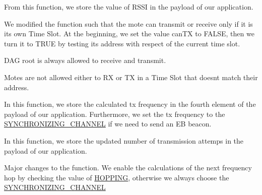 
\begin{DoxyRefList}
\item[\label{_l_k_n_code_edits__LKN_code_edits000013}%
\hypertarget{_l_k_n_code_edits__LKN_code_edits000013}{}%
Member \hyperlink{_i_e_e_e802154_e_8c_a58945f36d3b05dea65c4d7014283154a}{activity\+\_\+ri5} (P\+O\+R\+T\+\_\+\+R\+A\+D\+I\+O\+T\+I\+M\+E\+R\+\_\+\+W\+I\+D\+TH captured\+Time)]From this function, we store the value of R\+S\+SI in the payload of our application.  
\item[\label{_l_k_n_code_edits__LKN_code_edits000010}%
\hypertarget{_l_k_n_code_edits__LKN_code_edits000010}{}%
Member \hyperlink{_i_e_e_e802154_e_8c_a365846cd666a324ee0d6ff55f79bb976}{activity\+\_\+ti1\+O\+Rri1} ()]We modified the function such that the mote can transmit or receive only if it is its own Time Slot. At the beginning, we set the value can\+TX to F\+A\+L\+SE, then we turn it to T\+R\+UE by testing its address with respect of the current time slot.
\begin{DoxyItemize}
\item D\+AG root is always allowed to receive and transmit.
\item Motes are not allowed either to RX or TX in a Time Slot that doesn\textquotesingle{}t match their address. 
\end{DoxyItemize}
\item[\label{_l_k_n_code_edits__LKN_code_edits000011}%
\hypertarget{_l_k_n_code_edits__LKN_code_edits000011}{}%
Member \hyperlink{_i_e_e_e802154_e_8c_a84922abdd433852f6d5d415e677af1a8}{activity\+\_\+ti2} ()]In this function, we store the calculated tx frequency in the fourth element of the payload of our application. Furthermore, we set the tx frequency to the \hyperlink{group___i_e_e_e802154_e_gaf8be83417584fa06ecb6982f183bd222}{S\+Y\+N\+C\+H\+R\+O\+N\+I\+Z\+I\+N\+G\+\_\+\+C\+H\+A\+N\+N\+EL} if we need to send an EB beacon. 
\item[\label{_l_k_n_code_edits__LKN_code_edits000012}%
\hypertarget{_l_k_n_code_edits__LKN_code_edits000012}{}%
Member \hyperlink{_i_e_e_e802154_e_8c_a052e22d89b7e22b5c384c398e35d90c0}{activity\+\_\+tie5} ()]In this function, we store the updated number of transmission attemps in the payload of our application.  
\item[\label{_l_k_n_code_edits__LKN_code_edits000016}%
\hypertarget{_l_k_n_code_edits__LKN_code_edits000016}{}%
Member \hyperlink{_i_e_e_e802154_e_8c_a01c55569f4f1aadf1d4a156b08014e50}{calculate\+Frequency} (uint8\+\_\+t channel\+Offset)]Major changes to the function. We enable the calculations of the next frequency hop by checking the value of \hyperlink{group___i_e_e_e802154_e_ga495914ac755e3089a99e6a6946c12971}{H\+O\+P\+P\+I\+NG}, otherwise we always choose the \hyperlink{group___i_e_e_e802154_e_gaf8be83417584fa06ecb6982f183bd222}{S\+Y\+N\+C\+H\+R\+O\+N\+I\+Z\+I\+N\+G\+\_\+\+C\+H\+A\+N\+N\+EL} 

\end{DoxyRefList}
